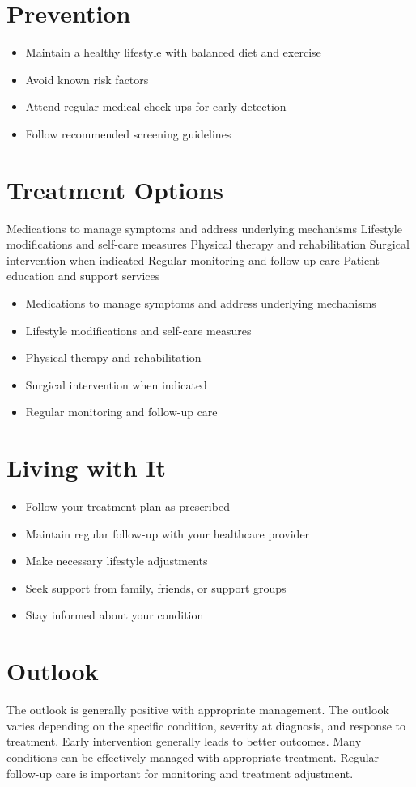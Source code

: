 \section{Prevention}
\begin{itemize}[noitemsep]
  \item Maintain a healthy lifestyle with balanced diet and exercise
  \item Avoid known risk factors
  \item Attend regular medical check-ups for early detection
  \item Follow recommended screening guidelines
\end{itemize}
\section{Treatment Options}
Medications to manage symptoms and address underlying mechanisms Lifestyle modifications and self-care measures Physical therapy and rehabilitation Surgical intervention when indicated Regular monitoring and follow-up care Patient education and support services

\begin{itemize}[noitemsep]
  \item Medications to manage symptoms and address underlying mechanisms
  \item Lifestyle modifications and self-care measures
  \item Physical therapy and rehabilitation
  \item Surgical intervention when indicated
  \item Regular monitoring and follow-up care
\end{itemize}
\section{Living with It}
\begin{itemize}[noitemsep]
  \item Follow your treatment plan as prescribed
  \item Maintain regular follow-up with your healthcare provider
  \item Make necessary lifestyle adjustments
  \item Seek support from family, friends, or support groups
  \item Stay informed about your condition
\end{itemize}
\section{Outlook}
The outlook is generally positive with appropriate management. The outlook varies depending on the specific condition, severity at diagnosis, and response to treatment. Early intervention generally leads to better outcomes. Many conditions can be effectively managed with appropriate treatment. Regular follow-up care is important for monitoring and treatment adjustment.
